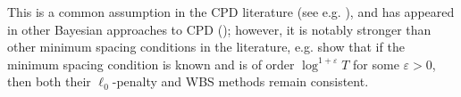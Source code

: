 This is a common assumption in the CPD literature (see e.g. \citealp{Csörgö97, Bai10}), and has appeared in other Bayesian approaches to CPD (\citealp{Cappello21, Cappello22}); however, it is notably stronger than other minimum spacing conditions in the literature, e.g. \cite{Wang2020_localization} show that if the minimum spacing condition is known and is of order $\log^{1+\varepsilon} T$ for some $\varepsilon > 0$, then both their $\ell_0$-penalty and WBS methods remain consistent.